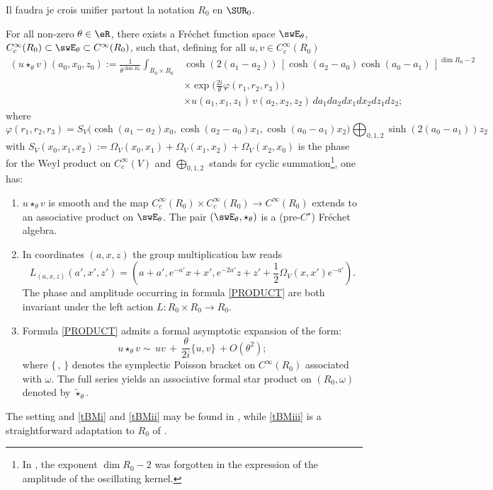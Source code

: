 \begin{probleme}
Il faudra je crois unifier partout la notation $R_0$ en $\SUR_0$.
\end{probleme}


\begin{theorem}
For all non-zero $\theta\in\eR$, there exists a Fréchet function space $\swE_\theta$, $C^\infty_c( R_0)\subset\swE_\theta\subset C^\infty( R_0)$, such that, defining for all $u,v\in C^\infty_c( R_0)$  
\begin{equation}  \label{PRODUCT}
\begin{split}
(u\star_\theta v)(a_0,x_0,z_0)
		:=\frac{1}{\theta^{\dim  R_0}} \int_{  R_0\times  R_0}& \cosh(2(a_1-a_2))\,[\cosh(a_2- a_0)\cosh(a_0-a_1)\,]^{\dim  R_0-2}\\
&\times \exp \Big( \frac{2i}{\theta}\varphi(r_1,r_2,r_3)\Big)\\
		&\times u(a_1,x_1,z_1)\,v(a_2,x_2,z_2)\, da_1da_2dx_1dx_2dz_1dz_2;
\end{split}
\end{equation}
where 
\[ 
  \varphi(r_1,r_2,r_3)=S_V\big(\cosh(a_1-a_2)x_0, \cosh(a_2-a_0)x_1, \cosh(a_0-a_1)x_2\big) \bigoplus_{0,1,2}\sinh(2(a_0-a_1))z_2 
\]
with $S_V(x_0,x_1,x_2):=\Omega_V(x_0,x_1)+\Omega_V(x_1,x_2)+\Omega_V(x_2,x_0)$ is the phase for the Weyl product on $C^\infty_c(V)$ and $\bigoplus_{0,1,2}$ stands for cyclic summation\footnote{In \cite{Biel-Massar}, the exponent $\dim  R_0-2$ was forgotten in the expression of the amplitude of the oscillating kernel.}, one has: 

\begin{enumerate}

\item\label{tBMi} 
	 $u\star_\theta v$ is smooth and the map $ C^\infty_c( R_0)\times C^\infty_c( R_0) \to C^\infty( R_0)$ extends to an associative product on $\swE_\theta$. The pair $(\swE_\theta,\star_\theta)$ is a (pre-$C^\star$) Fréchet algebra.

\item\label{tBMii}
	 In coordinates $(a,x,z)$ the group multiplication law reads
\[ 
	L_{(a,x,z)}(a',x',z')=\left(a+a',e^{-a'}x+x',e^{-2a'}z+z'+\frac{1}{2}\Omega_V(x,x')e^{-a'}
\right).
\]
The phase and amplitude occurring in formula \eqref{PRODUCT} are both invariant under the left action $L: R_0\times  R_0\to  R_0$.

\item\label{tBMiii}
	 Formula \eqref{PRODUCT} admits a formal asymptotic expansion of the form:
 \begin{equation*}
	u\star_\theta v\sim \,uv\,+\,\frac{\theta}{2i}\{u,v\}\,+O(\theta^2); 
\end{equation*}
where $\{\,,\,\}$ denotes the symplectic Poisson bracket on $C^\infty( R_0)$ associated with $\omega$.  The full series yields an associative formal star product on $( R_0,\omega)$ denoted by $\tilde{\star}_\theta$. 
 \end{enumerate}
\label{BIMAS}
\end{theorem}

The setting and \ref{tBMi} and \ref{tBMii} may be found in \cite{Biel-Massar}, while \ref{tBMiii} is a straightforward adaptation  to $ R_0$ of \cite{lcBBM}.

